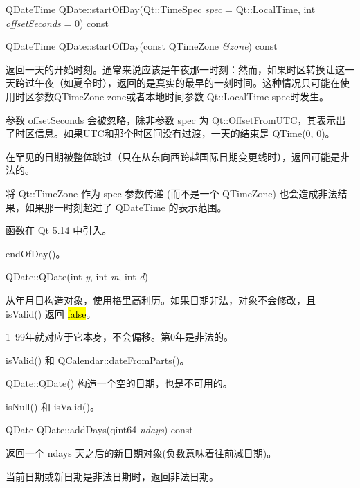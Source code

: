 \splitLine

QDateTime QDate::startOfDay(Qt::TimeSpec \emph{spec} = Qt::LocalTime, int \emph{offsetSeconds} = 0) const

QDateTime QDate::startOfDay(const QTimeZone \emph{\&zone}) const

返回一天的开始时刻。通常来说应该是午夜那一时刻：然而，如果时区转换让这一天跨过午夜（如夏令时），返回的是真实的最早的一刻时间。这种情况只可能在使用时区参数QTimeZone zone或者本地时间参数 Qt::LocalTime spec时发生。

参数 offsetSeconds 会被忽略，除非参数 spec 为 Qt::OffsetFromUTC，其表示出了时区信息。如果UTC和那个时区间没有过渡，一天的结束是 QTime(0, 0)。

在罕见的日期被整体跳过（只在从东向西跨越国际日期变更线时），返回可能是非法的。

将 Qt::TimeZone 作为 spec 参数传递 (而不是一个 QTimeZone) 也会造成非法结果，如果那一时刻超过了 QDateTime 的表示范围。

函数在 Qt 5.14 中引入。

\begin{seeAlso}
endOfDay()。
\end{seeAlso}

\splitLine

QDate::QDate(int \emph{y}, int \emph{m}, int \emph{d})

从年月日构造对象，使用格里高利历。如果日期非法，对象不会修改，且 isValid() 返回 \hl{false}。


\begin{notice}
1~99年就对应于它本身，不会偏移。第0年是非法的。
\end{notice}


\begin{seeAlso}
isValid() 和 QCalendar::dateFromParts()。
\end{seeAlso}



\splitLine

QDate::QDate()
构造一个空的日期，也是不可用的。


\begin{seeAlso}
isNull() 和 isValid()。
\end{seeAlso}

\splitLine

QDate QDate::addDays(qint64 \emph{ndays}) const

返回一个 ndays 天之后的新日期对象(负数意味着往前减日期)。

当前日期或新日期是非法日期时，返回非法日期。



